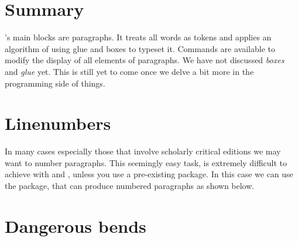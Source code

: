 
\section{Summary}
\tex's main blocks are paragraphs. It treats all words as tokens and applies an algorithm of using glue and boxes to typeset it. Commands are available  to modify the display of all elements of paragraphs. We have not discussed {\em boxes} and {\em glue} yet. This is still yet to come once we delve a bit more in the programming side of things.

   
\section{Linenumbers}

In many cases especially those that involve scholarly critical editions we may want to number paragraphs. This seemingly easy task, is extremely difficult to achieve with \tex and \latex, unless you use a pre-existing package. In this case we can use the  package, that can produce numbered paragraphs as shown below.



\section{Dangerous bends}
\gdef\tstory{There are cries, sobs, confusion among the people, and
     at that moment the cardinal himself, the Grand Inquisitor, passes by the
     cathedral. He is an old man, almost ninety, tall and erect, with a
     withered face and sunken eyes, in which there is still a gleam of light.
     He is not dressed in his brilliant cardinal's robes, as he was the day
     before, when he was burning the enemies of the Roman Church~\char144
     \kern2em\hfill---Fyodor Dostoyevsky}

